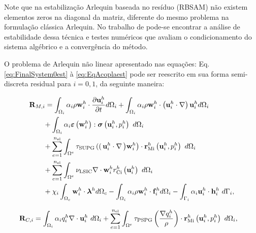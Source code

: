 \documentclass[tese_patricia]{subfiles}
\begin{document}
Note que na estabilização Arlequin baseada no resíduo (RBSAM) não existem elementos zeros na diagonal da matriz, diferente do mesmo problema na formulação clássica Arlequin. No trabalho de  pode-se encontrar a análise de estabilidade dessa técnica e testes numéricos que avaliam o condicionamento do sistema algébrico e a convergência do método.

O problema de Arlequin não linear apresentado nas equações: Eq. \ref{eq:FinalSystem0est} à \ref{eq:EqAcoplaest} pode ser reescrito em sua forma semi-discreta residual para $i=0,1$, da seguinte maneira:

\begin{align}
	\begin{split}
		&\mathbf{R}_{M,i} = \int_{\domain_i} \arlequinWF_{i} \density \wArlqi \cdot \frac{\partial\uArlqi}{\partial t} d\domain_{i} +
		\int_{\domain_i} \arlequinWF_{i} \density \wArlqi \cdot  \left(\uArlqi \cdot \nabla\right)\uArlqi d\domain_{i}  \\ 
		&\qquad+	
		\int_{\domain_{i}} \arlequinWF_{i} \straintensor \left(\wArlqi\right) : \stresstensor \left(\uArlqi,\pArlqi\right)\ d\domain_{i} 
		\\ 
		&\qquad+ \sum_{e=1}^{\nel} \int_{\domainE} \SUPG  \left( \right(\uArlqi \cdot \nabla \left) \wArlqi\right) \cdot \resMomI \left(\uArlqi,\pArlqi \right)\  d\domain_{i} \\ 
		&\qquad+\sum_{e=1}^{\nel} \int_{\domainE} \LSIC \nabla \cdot \wArlqi \resPreI
		\left(\uArlqi\right)\  d\domain_{i} \\
		&\qquad+ \chi_{i} \int_{\domain_c} \wArlqi \cdot \lagrangeMultiplier^{h} d\domain_{c} - \int_{\domain_i} \arlequinWF_{i} \density \wArlqi \cdot  \sbodyforce_{i}^{h} d\domain_{i} - \int_{\boundary_{i}} \arlequinWF_{i} \uArlqi \cdot \straction_{i}^{h}\ d\boundary_{i},
		\label{eq:ResidualMomentum}
	\end{split}
\end{align}


\begin{align}
	\begin{split}
		&\mathbf{R}_{C,i} = \int_{\Omega_{i}} \alpha_{i} q_i^h \nabla \cdot \mathbf{u}_i^{h} \ d\Omega_{i} +
		\sum_{e=1}^{n_{\mathrm{el}}} \int_{\Omega^e} \tau_{\mathrm{PSPG}} \left(\frac{\nabla q_i^h }{\rho}\right) \cdot \mathbf{r}_{\mathrm{Mi}}^{h} \left(\mathbf{u}_i^{h},p_i^{h} \right) \  d\Omega_{i},
		\label{eq:ResidualContinum}
	\end{split}
\end{align}
\end{document}
